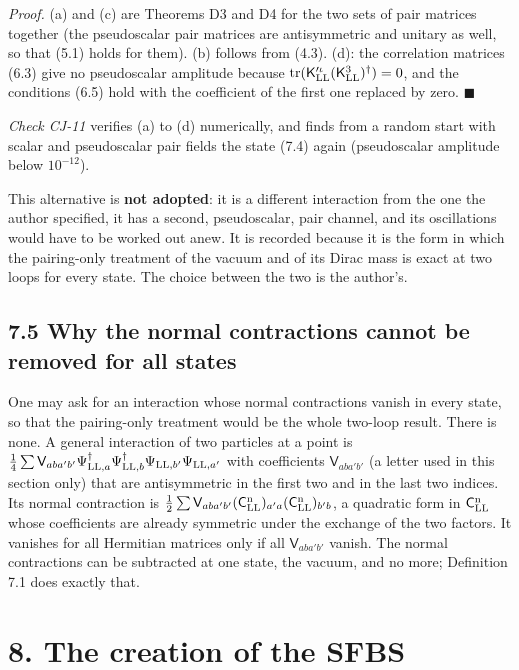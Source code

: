 \documentclass[
  10pt,
]{article}
\begin{document}
\emph{Proof.} (a) and (c) are Theorems D3 and D4 for the two sets of
pair matrices together (the pseudoscalar pair matrices are antisymmetric
and unitary as well, so that (5.1) holds for them). (b) follows from
(4.3). (d): the correlation matrices (6.3) give no pseudoscalar
amplitude because
\(\mathrm{tr}(\mathsf K'^\iota_{\rm LL}(\mathsf K^3_{\rm LL})^\dagger)=0\),
and the conditions (6.5) hold with the coefficient of the first one
replaced by zero. \(\blacksquare\)

\emph{Check CJ-11} verifies (a) to (d) numerically, and finds from a
random start with scalar and pseudoscalar pair fields the state (7.4)
again (pseudoscalar amplitude below \(10^{-12}\)).

This alternative is \textbf{not adopted}: it is a different interaction
from the one the author specified, it has a second, pseudoscalar, pair
channel, and its oscillations would have to be worked out anew. It is
recorded because it is the form in which the pairing-only treatment of
the vacuum and of its Dirac mass is exact at two loops for every state.
The choice between the two is the author's.

\hypertarget{why-the-normal-contractions-cannot-be-removed-for-all-states}{%
\subsection{7.5 Why the normal contractions cannot be removed for all
states}\label{why-the-normal-contractions-cannot-be-removed-for-all-states}}

One may ask for an interaction whose normal contractions vanish in every
state, so that the pairing-only treatment would be the whole two-loop
result. There is none. A general interaction of two particles at a point
is
\(\tfrac14\sum\mathsf V_{aba'b'}\Psi^\dagger_{{\rm LL},a}\Psi^\dagger_{{\rm LL},b}\Psi_{{\rm LL},b'}\Psi_{{\rm LL},a'}\)
with coefficients \(\mathsf V_{aba'b'}\) (a letter used in this section
only) that are antisymmetric in the first two and in the last two
indices. Its normal contraction is
\(\tfrac12\sum\mathsf V_{aba'b'}(\mathsf C^{\rm n}_{\rm LL})_{a'a}(\mathsf C^{\rm n}_{\rm LL})_{b'b}\),
a quadratic form in \(\mathsf C^{\rm n}_{\rm LL}\) whose coefficients
are already symmetric under the exchange of the two factors. It vanishes
for all Hermitian matrices only if all \(\mathsf V_{aba'b'}\) vanish.
The normal contractions can be subtracted at one state, the vacuum, and
no more; Definition 7.1 does exactly that.

\hypertarget{the-creation-of-the-sfbs}{%
\section{8. The creation of the SFBS}\label{the-creation-of-the-sfbs}}
\end{document}
